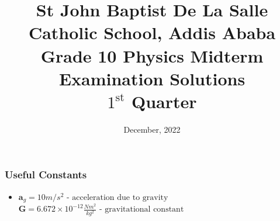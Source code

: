 \documentclass[13pt,addpoints]{exam}
\date{December, 2022}
\begin{document}
	\title{St John Baptist De La Salle Catholic School, Addis Ababa\\
		\large Grade 10 Physics Midterm Examination Solutions\\
		$1^\text{st}$ Quarter}
	\maketitle
	\begin{center}
		\subsubsection*{Useful Constants}
		\begin{itemize}
			\item $\textbf{a}_g=10m/s^2\text{  - acceleration due to gravity}$\textbf{~}$\textbf{G} = 6.672\times10^{-12}\frac{Nm^2}{kg^2}\text{  - gravitational constant}$
		\end{itemize}
		
	\end{center}
\end{document}
